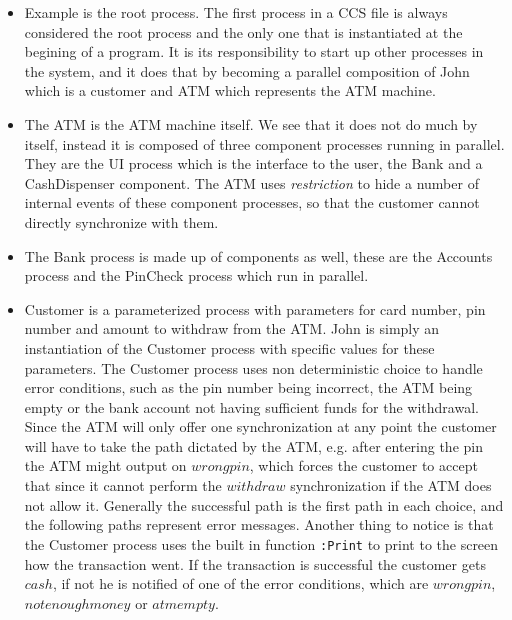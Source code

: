   \begin{itemize}
  
 		\item \textsf{Example} is the root process. The first process in a CCS 
 		file is always considered the root process and the only one that is 
 		instantiated at the begining of a  program. It is its responsibility to 
 		start up other processes in the system, and it does that by becoming a 
 		parallel composition of \textsf{John} which is a customer and \textsf{ATM} 
 		which represents the ATM machine.
 		
		\item The \textsf{ATM} is the ATM machine itself. We see that it does not 
		do much by itself, instead it is composed of three component processes 
		running in parallel. They are the \textsf{UI} process which is the 
		interface to the user, the \textsf{Bank} and a \textsf{CashDispenser} 
		component. The \textsf{ATM} uses \textit{restriction} to hide a number of 
		internal events of these component processes, so that the customer cannot 
		directly synchronize with them.
		
		\item The \textsf{Bank} process is made up of components as well, these 
		are the \textsf{Accounts} process and the \textsf{PinCheck} process which 
		run in parallel.
		
		\item \textsf{Customer} is a parameterized process with parameters for 
		card number, pin number and amount to withdraw from the ATM. \textsf{John} 
		is simply an instantiation of the \textsf{Customer} process with specific 
		values for these parameters. The \textsf{Customer} process uses non 
		deterministic choice to handle error conditions, such as the pin number 
		being incorrect, the ATM being empty or the bank account not having 
		sufficient funds for the withdrawal. Since the ATM will only offer one 
		synchronization at any point the customer will have to take the path 
		dictated by the ATM, e.g. after entering the pin the ATM might output on 
		$wrongpin$, which forces the customer to accept that since it cannot 
		perform the $withdraw$ synchronization if the ATM does not allow it. 
		Generally the successful path is the first path in each choice, and the 
		following paths represent error messages. Another thing to notice is that
		the \textsf{Customer} process uses the built in function \texttt{:Print} to
		print to the screen how the transaction went. If the transaction is 
		successful the customer gets $cash$, if not he is notified of one of the 
		error conditions, which are $wrongpin$, $notenoughmoney$ or $atmempty$.
		

\end{itemize}
